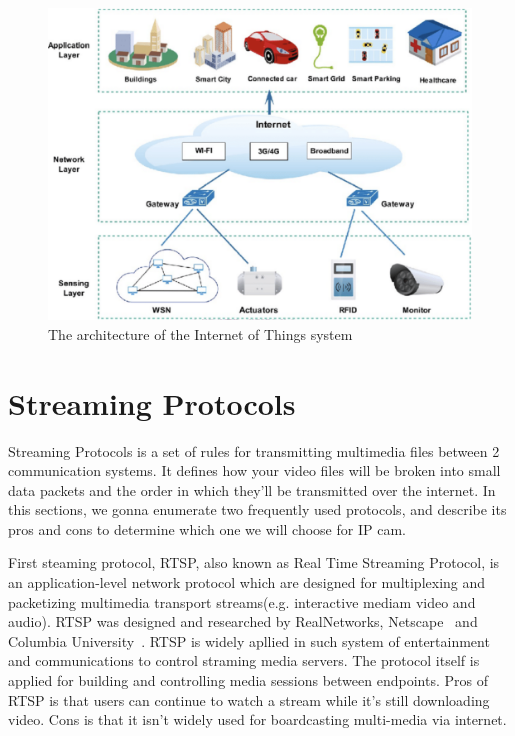 \begin{figure}[H]
    \centering
    \includegraphics[width=\textwidth]{figsrc/iot-intro.png}
    \caption{The architecture of the Internet of Things system~\cite{iot-intro-02}\label{fig:iot-intro-02}}
\end{figure}

\section{Streaming Protocols}
Streaming Protocols is a set of rules for transmitting multimedia files between 2 communication systems. It defines how your video files will be broken into small data packets and the order in which they'll be transmitted over the internet.
In this sections, we gonna enumerate two frequently used protocols, and describe its pros and cons to determine which one we will choose for IP cam.

First steaming protocol, RTSP, also known as Real Time Streaming Protocol, is an application-level network protocol which are designed for multiplexing and packetizing multimedia transport streams(e.g. interactive mediam video and audio). RTSP was designed and researched by RealNetworks, Netscape~\cite{rtsp-intro-01} and Columbia University~\cite{rtsp-intro-02}. RTSP is widely apllied in such system of entertainment and communications to control straming media servers. The protocol itself is applied for building and controlling media sessions between endpoints. Pros of RTSP is that users can continue to watch a stream while it's still downloading video. Cons is that it isn't widely used for boardcasting multi-media via internet. 


